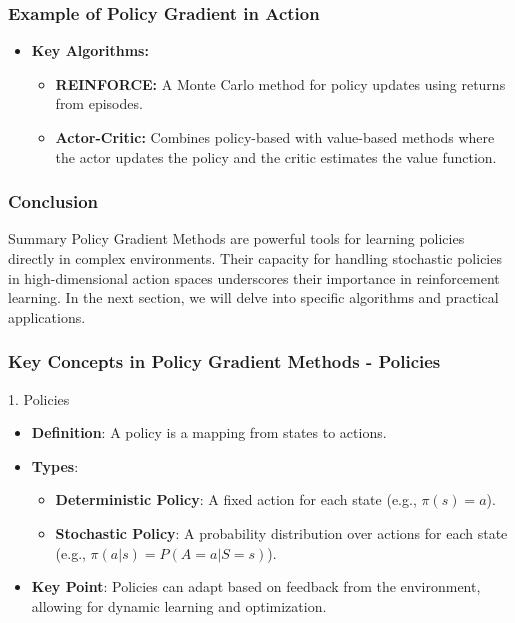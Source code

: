 \documentclass[aspectratio=169]{beamer}
\begin{document}
\begin{frame}[fragile]
    \frametitle{Example of Policy Gradient in Action}
    \begin{itemize}
        \item \textbf{Key Algorithms:}
        \begin{itemize}
            \item \textbf{REINFORCE:} A Monte Carlo method for policy updates using returns from episodes.
            \item \textbf{Actor-Critic:} Combines policy-based with value-based methods where the actor updates the policy and the critic estimates the value function.
        \end{itemize}
    \end{itemize}
\end{frame}

\begin{frame}[fragile]
    \frametitle{Conclusion}
    \begin{block}{Summary}
        Policy Gradient Methods are powerful tools for learning policies directly in complex environments. Their capacity for handling stochastic policies in high-dimensional action spaces underscores their importance in reinforcement learning. In the next section, we will delve into specific algorithms and practical applications.
    \end{block}
\end{frame}

\begin{frame}[fragile]
    \frametitle{Key Concepts in Policy Gradient Methods - Policies}
    \begin{block}{1. Policies}
        \begin{itemize}
            \item \textbf{Definition}: A policy is a mapping from states to actions.
            \item \textbf{Types}:
                \begin{itemize}
                    \item \textbf{Deterministic Policy}: A fixed action for each state (e.g., \( \pi(s) = a \)).
                    \item \textbf{Stochastic Policy}: A probability distribution over actions for each state (e.g., \( \pi(a | s) = P(A = a | S = s) \)).
                \end{itemize}
            \item \textbf{Key Point}: Policies can adapt based on feedback from the environment, allowing for dynamic learning and optimization.
        \end{itemize}
    \end{block}
\end{frame}
\end{document}
